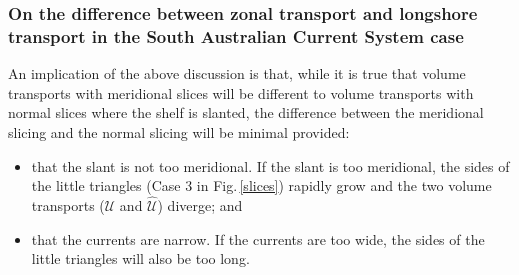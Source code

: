 \documentclass[preprint,3p,review,12pt]{elsarticle}
\begin{document}
\subsubsection{On the difference between zonal transport and longshore transport in the South Australian Current System case}
An implication of the above discussion is that, while it is true that volume transports with meridional slices will be different to volume transports with normal slices where the shelf is slanted, the difference between the meridional slicing and the normal slicing will be minimal provided:
%
\begin{itemize}
    \item that the slant is not too meridional. If the slant is too meridional, the sides of the little triangles (Case 3 in Fig.\,\ref{slices}) rapidly grow and the two volume transports ($\mathcal{U}$ and $\hat{\mathcal{U}}$) diverge; and
%
    \item that the currents are narrow. If the currents are too wide, the sides of the little triangles will also be too long.
\end{itemize}
\end{document}
